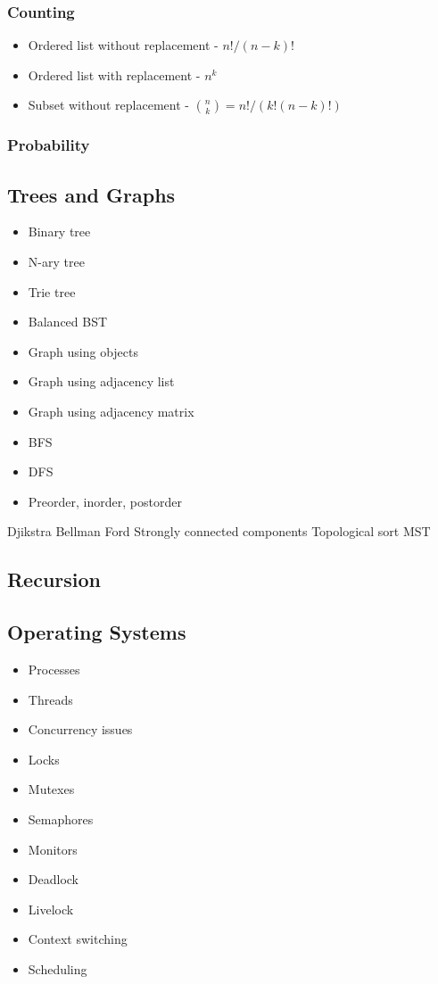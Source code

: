 \documentclass{article}
\begin{document}
\subsubsection{Counting}
\begin{itemize}
    \item Ordered list without replacement - $n!/(n-k)!$
    \item Ordered list with replacement - $n^k$
    \item Subset without replacement - $\binom{n}{k} = n!/(k!(n-k)!)$
\end{itemize}
\subsubsection{Probability}

\subsection{Trees and Graphs}
\begin{itemize}
    \item Binary tree
    \item N-ary tree
    \item Trie tree
    \item Balanced BST
    \item Graph using objects
    \item Graph using adjacency list
    \item Graph using adjacency matrix
    \item BFS
    \item DFS
    \item Preorder, inorder, postorder
\end{itemize}
Djikstra
Bellman Ford
Strongly connected components
Topological sort
MST

\subsection{Recursion}

\subsection{Operating Systems}
\begin{itemize}
    \item Processes
    \item Threads
    \item Concurrency issues
    \item Locks
    \item Mutexes
    \item Semaphores
    \item Monitors
    \item Deadlock
    \item Livelock
    \item Context switching
    \item Scheduling
\end{itemize}
\end{document}

